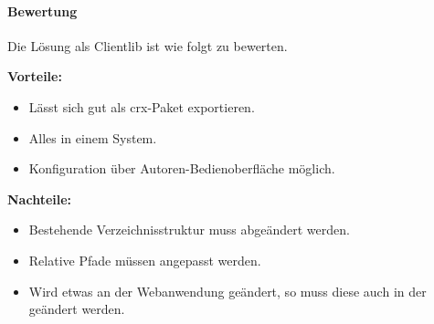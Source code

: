 \paragraph{Bewertung}

Die Lösung als Clientlib ist wie folgt zu bewerten.

\begin{minipage}[t]{0.5\textwidth}
	\textbf{Vorteile:}
	\begin{itemize}
		\item Lässt sich gut als \ac{crx}-Paket exportieren.
		\item Alles in einem System.
		\item Konfiguration über Autoren-Bedienoberfläche möglich.
	\end{itemize}
\end{minipage}
\begin{minipage}[t]{0.5\textwidth}
	\textbf{Nachteile:}
	\begin{itemize}
		\item Bestehende Verzeichnisstruktur muss abgeändert werden.
		\item Relative Pfade müssen angepasst werden.
		\item Wird etwas an der Webanwendung geändert, so muss diese auch in der \ajc geändert werden.
	\end{itemize}
\end{minipage}